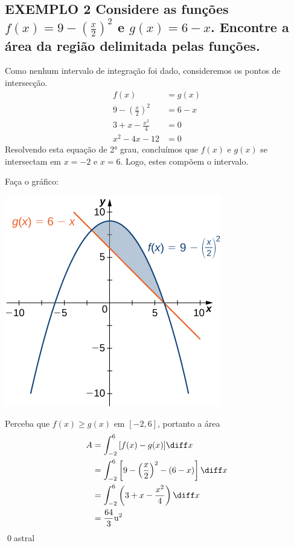 \documentclass[a4paper, 12pt]{extreport}
\begin{document}
    \subsection*{\small {\color{astral}EXEMPLO 2} \textmd{
      Considere as funções $f(x) = 9-\left(\frac{x}{2}\right)^2$ e $g(x) = 6-x$. Encontre a área da região delimitada pelas funções.
    }}
      Como nenhum intervalo de integração foi dado, consideremos os pontos de intersecção.
        \begin{equation*}
          \begin{split}
            f(x) & = g(x) \\
            9-\left(\frac{x}{2}\right)^2 & = 6-x \\
            3+x-\frac{x^2}{4} & = 0 \\
            x^2-4x-12 & = 0
          \end{split}
        \end{equation*}
      Resolvendo esta equação de 2° grau, concluímos que $f(x)$ e $g(x)$ se intersectam em $x = -2$ e $x = 6$. Logo, estes compõem o intervalo.

      Faça o gráfico:

      \begin{center}
        \includegraphics{eg2}
      \end{center}

      Perceba que $f(x) \geqslant g(x)$ em $[-2, 6]$, portanto a área
      \begin{equation*}
        \begin{split}
          A & = \int_{-2}^6{[f(x)-g(x)]\diff x} \\
            & = \int_{-2}^6{\left[9-\left(\frac{x}{2}\right)^2-(6-x)\right]\diff x} \\
            & = \int_{-2}^6{\left(3+x-\frac{x^2}{4}\right)\diff x} \\
            & = \frac{64}{3}\mathrm{u^2}
        \end{split}
      \end{equation*}
      \qed{astral}
\end{document}
